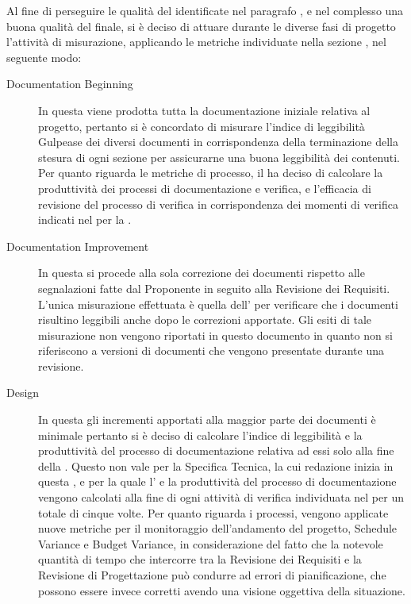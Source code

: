 		Al fine di perseguire le qualità del  identificate nel paragrafo , e nel complesso una buona qualità del  finale, si è deciso di attuare durante le diverse fasi di progetto l'attività di misurazione, applicando le metriche individuate nella sezione , nel seguente modo:
		\begin{description}
		\item[ Documentation Beginning] In questa  viene prodotta tutta la documentazione iniziale relativa al progetto, pertanto si è concordato di misurare l'indice di leggibilità Gulpease dei diversi documenti in corrispondenza della terminazione della stesura di ogni sezione per assicurarne una buona leggibilità dei contenuti. Per quanto riguarda le metriche di processo, il  ha deciso di calcolare la produttività dei processi di documentazione e verifica, e l'efficacia di revisione del processo di verifica in corrispondenza dei momenti di verifica indicati nel  per la .
		\item[ Documentation Improvement] In questa  si procede alla sola correzione dei documenti rispetto alle segnalazioni fatte dal Proponente in seguito alla Revisione dei Requisiti. L'unica misurazione effettuata è quella dell' per verificare che i documenti risultino leggibili anche dopo le correzioni apportate. Gli esiti di tale misurazione non vengono riportati in questo documento in quanto non si riferiscono a versioni di documenti che vengono presentate durante una revisione. 
		\item[  Design] In questa  gli incrementi apportati alla maggior parte dei documenti è minimale pertanto si è deciso di calcolare l'indice di leggibilità e la produttività del processo di documentazione relativa ad essi solo alla fine della . Questo non vale per la Specifica Tecnica, la cui redazione inizia in questa , e per la quale l' e la produttività  del processo di documentazione vengono calcolati alla fine di ogni attività di verifica individuata nel  per un totale di cinque volte.
		Per quanto riguarda i processi, vengono applicate nuove metriche per il monitoraggio dell'andamento del progetto, Schedule Variance e Budget Variance, in considerazione del fatto che la notevole quantità di tempo che intercorre tra la Revisione dei Requisiti e la Revisione di Progettazione può condurre ad errori di pianificazione, che possono essere invece corretti avendo una visione oggettiva della situazione.

\end{description}
